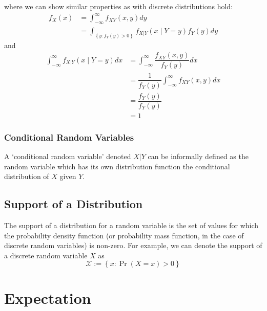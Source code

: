 \documentclass[11pt]{report} %
\begin{document}
where we can show similar properties as with discrete distributions hold:
\begin{align}
f_{X}\left(x\right) &= \int_{-\infty}^{\infty}f_{XY}\left(x, y\right)dy \\
&= \int_{\left\{y: f_{Y}\left(y\right) > 0\right\}}f_{X|Y}\left(x\middle|Y = y\right)f_{Y}\left(y\right)dy
\end{align}
and
\begin{align}
\int_{-\infty}^{\infty}f_{X|Y}\left(x\middle|Y = y\right)dx &= \int_{-\infty}^{\infty}\dfrac{f_{XY}\left(x, y\right)}{f_{Y}\left(y\right)}dx \\
&= \dfrac{1}{f_{Y}\left(y\right)}\int_{-\infty}^{\infty}f_{XY}\left(x, y\right)dx \\
&= \dfrac{f_{Y}\left(y\right)}{f_{Y}\left(y\right)} \\
&= 1
\end{align}

\subsubsection{Conditional Random Variables}

A `conditional random variable' denoted $X|Y$ can be informally defined as the random variable which has its own distribution function the conditional distribution of $X$ given $Y$.

\subsection{Support of a Distribution}

The support of a distribution for a random variable is the set of values for which the probability density function (or probability mass function, in the case of discrete random variables) is non-zero. For example, we can denote the support of a discrete random variable $X$ as
\begin{equation}
\mathcal{X} := \left\{x: \operatorname{Pr}\left(X = x\right) > 0\right\}
\end{equation}

\section{Expectation}
\end{document}
